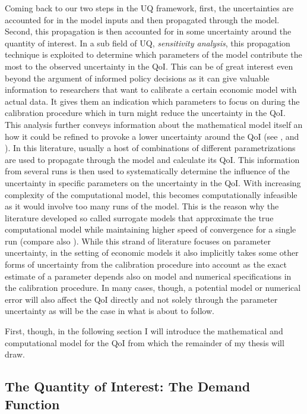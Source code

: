 Coming back to our two steps in the UQ framework, first, the uncertainties are accounted for in the model inputs and then propagated through the model. Second, this propagation is then accounted for in some uncertainty around the quantity of interest. In a sub field of UQ, \textit{sensitivity analysis}, this propagation technique is exploited to determine which parameters of the model contribute the most to the observed uncertainty in the QoI. This can be of great interest even beyond the argument of informed policy decisions as it can give valuable information to researchers that want to calibrate a certain economic model with actual data. It gives them an indication which parameters to focus on during the calibration procedure which in turn might reduce the uncertainty in the QoI. This analysis further conveys information about the mathematical model itself an how it could be refined to provoke a lower uncertainty around the QoI (see \cite{Scheidegger.2019},  \cite{Harenberg.2019} and \cite{Ghanem.2017}). In this literature, usually a host of combinations of different parametrizations are used to propagate through the model and calculate its QoI. This information from several runs is then used to systematically determine the influence of the uncertainty in specific parameters on the uncertainty in the QoI. With increasing complexity of the computational model, this becomes computationally infeasible as it would involve too many runs of the model. This is the reason why the literature developed so called surrogate models that approximate the true computational model while maintaining higher speed of convergence for a single run (compare also \cite{Saltelli.2008}). While this strand of literature focuses on parameter uncertainty, in the setting of economic models it also implicitly takes some other forms of uncertainty from the calibration procedure into account as the exact estimate of a parameter depends also on model and numerical specifications in the calibration procedure. In many cases, though, a potential model or numerical error will also affect the QoI directly and not solely through the parameter uncertainty as will be the case in what is about to follow.

First, though, in the following section I will introduce the mathematical and computational model for the QoI from which the remainder of my thesis will draw.

\subsection{The Quantity of Interest: The Demand Function}

